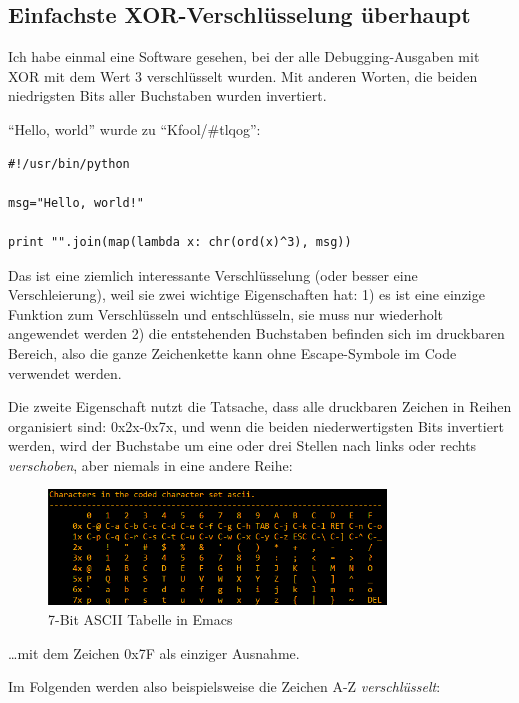 \subsection{Einfachste XOR-Verschlüsselung überhaupt}

Ich habe einmal eine Software gesehen, bei der alle Debugging-Ausgaben mit XOR mit dem Wert 3
verschlüsselt wurden. Mit anderen Worten, die beiden niedrigsten Bits aller Buchstaben wurden invertiert.

``Hello, world'' wurde zu ``Kfool/\#tlqog'':

\begin{lstlisting}[caption=Python,style=custompy]
#!/usr/bin/python

msg="Hello, world!"

print "".join(map(lambda x: chr(ord(x)^3), msg))
\end{lstlisting}

Das ist eine ziemlich interessante Verschlüsselung (oder besser eine Verschleierung),
weil sie zwei wichtige Eigenschaften hat:
1) es ist eine einzige Funktion zum Verschlüsseln und entschlüsseln, sie muss nur wiederholt angewendet werden
2) die entstehenden Buchstaben befinden sich im druckbaren Bereich, also die ganze Zeichenkette kann ohne
Escape-Symbole im Code verwendet werden.

Die zweite Eigenschaft nutzt die Tatsache, dass alle druckbaren Zeichen in Reihen organisiert sind: 0x2x-0x7x,
und wenn die beiden niederwertigsten Bits invertiert werden, wird der Buchstabe um eine oder drei Stellen nach
links oder rechts \emph{verschoben}, aber niemals in eine andere Reihe:

\begin{figure}[H]
\centering
\includegraphics[width=0.8\textwidth]{ascii_clean.png}
\caption{7-Bit \ac{ASCII} Tabelle in Emacs}
\end{figure}

\dots mit dem Zeichen 0x7F als einziger Ausnahme.

Im Folgenden werden also beispielsweise die Zeichen A-Z \emph{verschlüsselt}:

